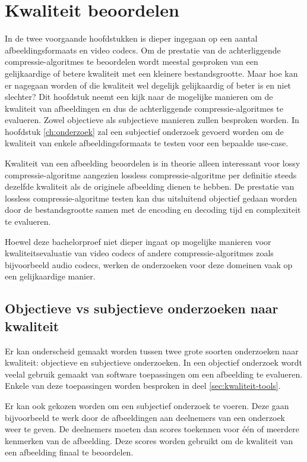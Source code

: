 \chapter{Kwaliteit beoordelen}
\label{ch:kwaliteit}

In de twee voorgaande hoofdstukken is dieper ingegaan op een aantal \glspl{afbeeldingsformaat} en video \glspl{codec}. Om de prestatie van de achterliggende \glspl{compressie-algoritme} te beoordelen wordt meestal gesproken van een gelijkaardige of betere kwaliteit met een kleinere bestandsgrootte. Maar hoe kan er nagegaan worden of die kwaliteit wel degelijk gelijkaardig of beter is en niet slechter? Dit hoofdstuk neemt een kijk naar de mogelijke manieren om de kwaliteit van afbeeldingen en dus de achterliggende \glspl{compressie-algoritme} te evalueren. Zowel objectieve als subjectieve manieren zullen besproken worden. In hoofdstuk \ref{ch:onderzoek} zal een subjectief onderzoek gevoerd worden om de kwaliteit van enkele \glspl{afbeeldingsformaat} te testen voor een bepaalde \gls{use-case}. 

Kwaliteit van een afbeelding beoordelen is in theorie alleen interessant voor \gls{lossy} \gls{compressie-algoritme} aangezien \gls{lossless} \gls{compressie-algoritme} per definitie steeds dezelfde kwaliteit als de originele afbeelding dienen te hebben. De prestatie van \gls{lossless} \gls{compressie-algoritme} testen kan dus uitsluitend objectief gedaan worden door de bestandsgrootte samen met de \gls{encoding} en \gls{decoding} tijd en complexiteit te evalueren.

Hoewel deze bachelorproef niet dieper ingaat op mogelijke manieren voor kwaliteitsevaluatie van video \glspl{codec} of andere \glspl{compressie-algoritme} zoals bijvoorbeeld audio \glspl{codec}, werken de onderzoeken voor deze domeinen vaak op een gelijkaardige manier.

\section{Objectieve vs subjectieve onderzoeken naar kwaliteit}
\label{sec:kwaliteit-objectief-subjectief}

Er kan onderscheid gemaakt worden tussen twee grote soorten onderzoeken naar kwaliteit: objectieve en subjectieve onderzoeken. In een objectief onderzoek wordt veelal gebruik gemaakt van software toepassingen om een afbeelding te evalueren. Enkele van deze toepassingen worden besproken in deel \ref{sec:kwaliteit-tools}. 
	
Er kan ook gekozen worden om een subjectief onderzoek te voeren. Deze gaan bijvoorbeeld te werk door de afbeeldingen aan deelnemers van een onderzoek weer te geven. De deelnemers moeten dan scores toekennen voor één of meerdere kenmerken van de afbeelding. Deze scores worden gebruikt om de kwaliteit van een afbeelding finaal te beoordelen. 

